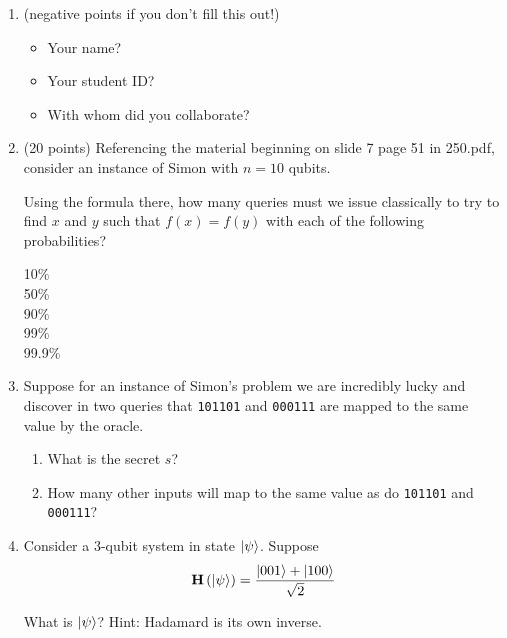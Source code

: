 \documentclass[12pt]{article}
\begin{document}


\begin{enumerate}[font=\bfseries]

\item {} (negative points if you don't fill this out!)
\begin{itemize}
    \item Your name?\Blank[20em]{}
    \item Your student ID?\Blank[12em]{}
    \item With whom did you collaborate?
    \LeaveSpace{}
\end{itemize}

\item (20 points) Referencing the material beginning on slide 7 page 51 in 250.pdf, consider an instance of Simon with $n=10$ qubits.  

Using the formula there, how many queries must we issue classically to try to find $x$ and $y$ such that $f(x)=f(y)$ with each of the following probabilities?
\begin{description}
    \item[10\%] 
    \item[50\%] 
    \item[90\%] 
    \item[99\%] 
    \item[99.9\%] 
\end{description}
\item{} Suppose for an instance of Simon's problem we are incredibly lucky and discover in two queries that \texttt{101101} and \texttt{000111} are mapped to the same value by the oracle.  \begin{enumerate}[label=\theenumi.\arabic*]
    \item What is the secret $s$?
    \item How many other inputs will map to the same value as do \texttt{101101} and \texttt{000111}?
\end{enumerate}

\item {} Consider a 3-qubit system in state $\ket{\psi}$.  Suppose \[ \textbf{H}\left(\ket{\psi}\right)=\frac{\ket{001}+\ket{100}}{\sqrt{2}}\] 

What is $\ket{\psi}$? 
Hint: Hadamard is its own inverse.



\end{enumerate}
\end{document}
